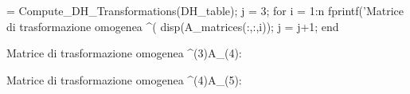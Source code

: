 \documentclass[11pt, a4paper]{article}
\begin{document}
\begin{matlabcode}
 = Compute_DH_Transformations(DH_table);
j = 3;
for i = 1:n
    fprintf('Matrice di trasformazione omogenea ^(%
    disp(A_matrices(:,:,i));
    j = j+1;
end
\end{matlabcode}
\begin{matlaboutput}
Matrice di trasformazione omogenea ^(3)A_(4):
\end{matlaboutput}
\begin{matlaboutput}
Matrice di trasformazione omogenea ^(4)A_(5):
\end{matlaboutput}
\end{document}
